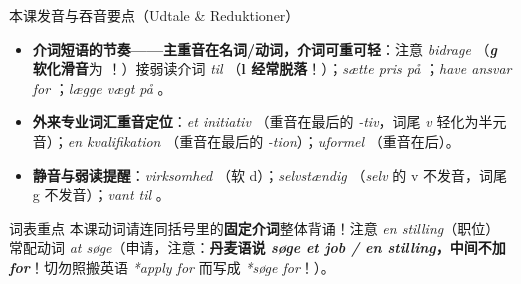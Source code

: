 \begin{tipbox}{本课发音与吞音要点（Udtale \& Reduktioner）}
\begin{itemize}
  \item \textbf{介词短语的节奏——主重音在名词/动词，介词可重可轻}：注意 \textit{bidrage} （\textbf{\textit{g} 软化滑音}为 ！）接弱读介词 \textit{til} （\textbf{l 经常脱落}！）；\textit{sætte pris på} ；\textit{have ansvar for} ；\textit{lægge vægt på} 。
  \item \textbf{外来专业词汇重音定位}：\textit{et initiativ} （重音在最后的 \textit{-tiv}，词尾 \textit{v} 轻化为半元音）；\textit{en kvalifikation} （重音在最后的 \textit{-tion}）；\textit{uformel} （重音在后）。
  \item \textbf{静音与弱读提醒}：\textit{virksomhed} （软 d）；\textit{selvstændig} （\textit{selv} 的 v 不发音，词尾 g 不发音）；\textit{vant til} 。
\end{itemize}
\end{tipbox}


\begin{tipbox}{词表重点}
本课动词请连同括号里的\textbf{固定介词}整体背诵！注意 \textit{en stilling}（职位）常配动词 \textit{at søge}（申请，注意：\textbf{丹麦语说 \textit{søge et job / en stilling}，中间不加 \textit{for}}！切勿照搬英语 \textit{*apply for} 而写成 \textit{*søge for}！）。
\end{tipbox}

